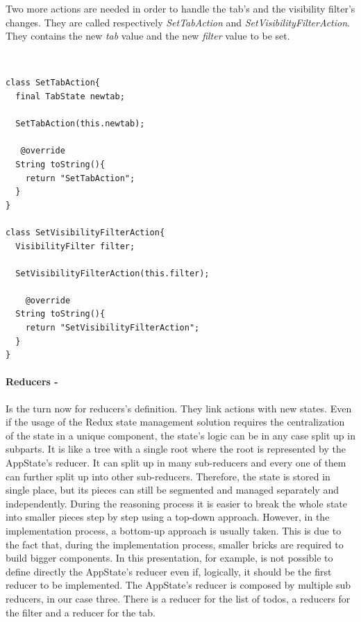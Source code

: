 Two more actions are needed in order to handle the tab's and the visibility filter's changes. They are called respectively  \textit{SetTabAction} and \textit{SetVisibilityFilterAction}. They contains the new \textit{tab} value and the new \textit{filter} value to be set.
\begin{code}
\mbox{}\\
 \mbox{}
		\label{code:2.14}
\begin{verbatim}
class SetTabAction{
  final TabState newtab;

  SetTabAction(this.newtab);
  
   @override
  String toString(){
    return "SetTabAction";
  }
}

class SetVisibilityFilterAction{
  VisibilityFilter filter;

  SetVisibilityFilterAction(this.filter);
  
    @override
  String toString(){
    return "SetVisibilityFilterAction";
  }
}
\end{verbatim}
\mbox{}
\end{code}

\paragraph{Reducers - }
\label{subpar:todo_app_bloc_core_state}
Is the turn now for reducers's definition. They link actions with new states. Even if the usage of the Redux state management solution requires the centralization of the state in a unique component, the state’s logic can be in any case split up in subparts. It is like a tree with a single root where the root is represented by the AppState's reducer.  It can split up in many sub-reducers and every one of them can further split up into other sub-reducers. Therefore, the state is stored in single place, but its pieces can still be segmented and managed separately and independently. During the reasoning process it is easier to break the whole state into smaller pieces step by step using a top-down approach. However, in the implementation process, a bottom-up approach is usually taken. This is due to the fact that, during the implementation process, smaller bricks are required to build bigger components. In this presentation, for example, is not possible to define directly the AppState's reducer even if, logically, it should be the first reducer to be implemented. The AppState's reducer is composed by multiple sub reducers, in our case three. There is a reducer for the list of todos, a reducers for the filter and a reducer for the tab. 
